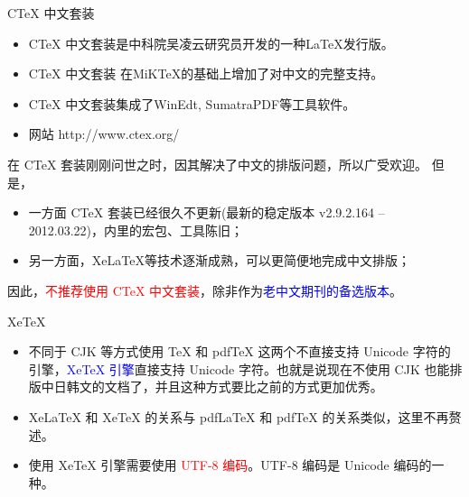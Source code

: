 \documentclass[13pt]{ctexbeamer}
\newcommand{\red}[1]{\textcolor{red}{#1}}
\newcommand{\blue}[1]{\textcolor{blue}{#1}}
\begin{document}
\begin{frame}{CTeX 中文套装}


	\begin{itemize}
		\item
		CTeX 中文套装是中科院吴凌云研究员开发的一种LaTeX发行版。

		\item
		CTeX 中文套装 在MiKTeX的基础上增加了对中文的完整支持。

		\item CTeX 中文套装集成了WinEdt, SumatraPDF等工具软件。
		\item
		网站  http://www.ctex.org/


	\end{itemize}
	在 CTeX 套装刚刚问世之时，因其解决了中文的排版问题，所以广受欢迎。 但是，
	\begin{itemize}
		\item  一方面 CTeX 套装已经很久不更新(最新的稳定版本	v2.9.2.164 -- 2012.03.22)，内里的宏包、工具陈旧；
		\item 另一方面，XeLaTeX等技术逐渐成熟，可以更简便地完成中文排版；
	\end{itemize}

	因此，\red{不推荐使用 CTeX 中文套装}，除非作为\blue{老中文期刊的备选版本}。

\end{frame}


\begin{frame}{XeTeX}

	\begin{itemize}
		\item 不同于 CJK 等方式使用 TeX 和 pdfTeX 这两个不直接支持 Unicode 字符的引擎，\blue{XeTeX 引擎}直接支持 Unicode 字符。也就是说现在不使用 CJK 也能排版中日韩文的文档了，并且这种方式要比之前的方式更加优秀。

		\item XeLaTeX 和 XeTeX 的关系与 pdfLaTeX 和 pdfTeX 的关系类似，这里不再赘述。

		\item  使用 XeTeX 引擎需要使用 \red{UTF-8 编码}。{UTF-8 编码}是 Unicode 编码的一种。
	\end{itemize}
\end{frame}
\end{document}
